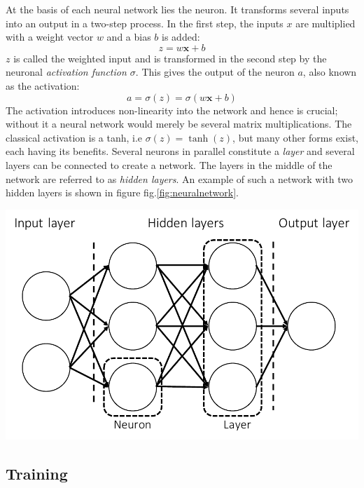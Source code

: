 \documentclass{Dissertate}
\let\origfigure\figure
\let\endorigfigure\endfigure
\renewenvironment{figure}[1][2] {
    \expandafter\origfigure\expandafter[H]
} {
    \endorigfigure
}
\begin{document}
At the basis of each neural network lies the neuron. It transforms
several inputs into an output in a two-step process. In the first step,
the inputs \(x\) are multiplied with a weight vector \(w\) and a bias
\(b\) is added: \[
z = w\mathbf{x}+b
\] \(z\) is called the weighted input and is transformed in the second
step by the neuronal \emph{activation function \(\sigma\)}. This gives
the output of the neuron \(a\), also known as the activation:
\begin{equation}
a = \sigma(z) = \sigma(w\mathbf{x}+b)
\label{eq:activation}\end{equation} The activation introduces
non-linearity into the network and hence is crucial; without it a neural
network would merely be several matrix multiplications. The classical
activation is a tanh, i.e \(\sigma(z)=\tanh(z)\), but many other forms
exist, each having its benefits. Several neurons in parallel constitute
a \emph{layer} and several layers can be connected to create a network.
The layers in the middle of the network are referred to as \emph{hidden
layers}. An example of such a network with two hidden layers is shown in
figure fig.\ref{fig:neuralnetwork}.

\begin{figure}
\hypertarget{fig:neuralnetwork}{%
\centering
\includegraphics{source/figures/pdf/neuralnetwork.pdf}
\caption{Schematic overview of a neural network. The left layer is known
as the input layer, the right layer as the output layer and the layers
inbetween are referred to as hidden layers.}\label{fig:neuralnetwork}
}
\end{figure}

\hypertarget{training}{%
\subsection{Training}\label{training}}
\end{document}
